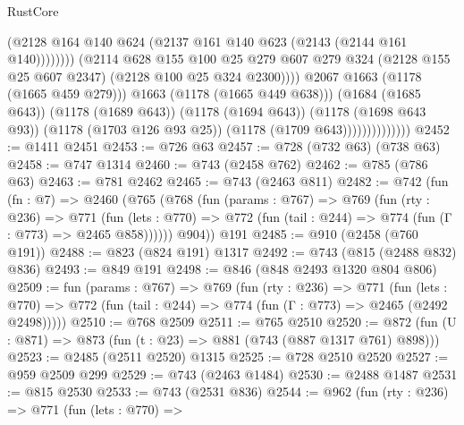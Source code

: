 \begin{lexlean}{RustCore}
\begin{coremodule}
                                            (@2128
                                              @164
                                              @140
                                              @624
                                              (@2137 @161 @140 @623 (@2143 (@2144 @161 @140))))))))
                                    (@2114
                                      @628
                                      @155
                                      @100
                                      @25
                                      @279
                                      @607
                                      @279
                                      @324
                                      (@2128 @155 @25 @607 @2347)
                                      (@2128 @100 @25 @324 @2300))))
                                @2067
                                @1663
                                (@1178 (@1665 @459 @279)))
                              @1663
                              (@1178 (@1665 @449 @638)))
                            (@1684 (@1685 @643))
                            (@1178 (@1689 @643))
                            (@1178 (@1694 @643))
                            (@1178 (@1698 @643 @93))
                            (@1178 (@1703 @126 @93 @25))
                            (@1178 (@1709 @643))))))))))))))
@2452 := @1411 @2451
@2453 := @726 @63
@2457 := @728 (@732 @63) (@738 @63)
@2458 := @747 @1314
@2460 := @743 (@2458 @762)
@2462 := @785 (@786 @63)
@2463 := @781 @2462
@2465 := @743 (@2463 @811)
@2482 := @742
    (fun (fn : @7) =>
    @2460
      (@765
        (@768
          (fun (params : @767) =>
          @769
            (fun (rty : @236) =>
            @771
              (fun (lets : @770) =>
              @772 (fun (tail : @244) => @774 (fun (Γ : @773) => @2465 @858))))))
        @904))
    @191
@2485 := @910 (@2458 (@760 @191))
@2488 := @823 (@824 @191) @1317
@2492 := @743 (@815 (@2488 @832) @836)
@2493 := @849 @191
@2498 := @846 (@848 @2493 @1320 @804 @806)
@2509 := fun (params : @767) =>
  @769
    (fun (rty : @236) =>
    @771
      (fun (lets : @770) =>
      @772 (fun (tail : @244) => @774 (fun (Γ : @773) => @2465 (@2492 @2498)))))
@2510 := @768 @2509
@2511 := @765 @2510
@2520 := @872 (fun (U : @871) => @873 (fun (t : @23) => @881 (@743 (@887 @1317 @761) @898)))
@2523 := @2485 (@2511 @2520) @1315
@2525 := @728 @2510 @2520
@2527 := @959 @2509 @299
@2529 := @743 (@2463 @1484)
@2530 := @2488 @1487
@2531 := @815 @2530
@2533 := @743 (@2531 @836)
@2544 := @962
    (fun (rty : @236) =>
    @771
      (fun (lets : @770) =>

\end{coremodule}
\end{lexlean}

